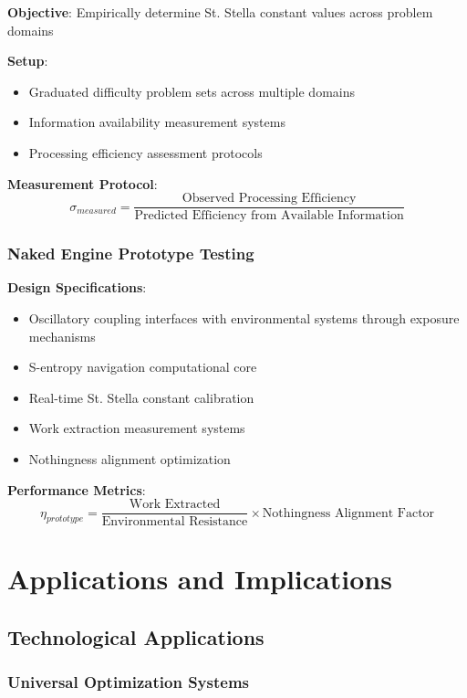 \documentclass[11pt,a4paper]{article}
\theoremstyle{remark}
\begin{document}
\textbf{Objective}: Empirically determine St. Stella constant values across problem domains

\textbf{Setup}:
\begin{itemize}
\item Graduated difficulty problem sets across multiple domains
\item Information availability measurement systems
\item Processing efficiency assessment protocols
\end{itemize}

\textbf{Measurement Protocol}:
\begin{equation}
\sigma_{measured} = \frac{\text{Observed Processing Efficiency}}{\text{Predicted Efficiency from Available Information}}
\end{equation}

\subsubsection{Naked Engine Prototype Testing}

\textbf{Design Specifications}:
\begin{itemize}
\item Oscillatory coupling interfaces with environmental systems through exposure mechanisms
\item S-entropy navigation computational core
\item Real-time St. Stella constant calibration
\item Work extraction measurement systems
\item Nothingness alignment optimization
\end{itemize}

\textbf{Performance Metrics}:
\begin{equation}
\eta_{prototype} = \frac{\text{Work Extracted}}{\text{Environmental Resistance}} \times \text{Nothingness Alignment Factor}
\end{equation}

\section{Applications and Implications}

\subsection{Technological Applications}

\subsubsection{Universal Optimization Systems}
\end{document}

